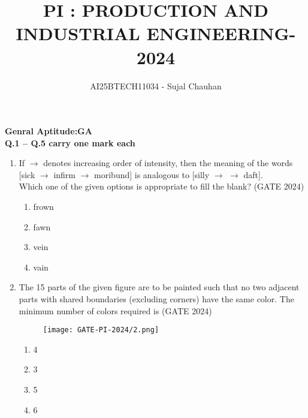 \documentclass[journal,12pt,onecolumn]{IEEEtran}
\theoremstyle{remark}
\begin{document}
\title{PI : PRODUCTION AND INDUSTRIAL ENGINEERING-2024}
\author{AI25BTECH11034 - Sujal Chauhan}
\maketitle
\renewcommand{\thefigure}{\theenumi}
\renewcommand{\thetable}{\theenumi}
\textbf{\large Genral Aptitude:GA}\\
\vspace{1cm}
\textbf{Q.1 -- Q.5 carry one mark each}
\begin{enumerate}

\item If $\to$ denotes increasing order of intensity, then the meaning of the words [sick $\to$ infirm $\to$ moribund] is analogous to [silly $\to$ \underline{\hspace{2cm}} $\to$ daft].\\
Which one of the given options is appropriate to fill the blank?
\hfill{(GATE 2024)}
\begin{multicols}{4}
\begin{enumerate}
    \item frown
    \item fawn
    \item vein
    \item vain
\end{enumerate}
\end{multicols}
\vspace{1cm}

\item The 15 parts of the given figure are to be painted such that no two adjacent parts with shared boundaries (excluding corners) have the same color. The minimum number of colors required is
\hfill{(GATE 2024)}
\begin{figure}[H]
    \centering
    \texttt{[image: GATE-PI-2024/2.png]} 
    \caption{}
    \label{2}
\end{figure}
\begin{multicols}{4}
\begin{enumerate}
    \item 4
    \item 3
    \item 5
    \item 6
\end{enumerate}
\end{multicols}
\vspace{1cm}


\end{enumerate}
\end{document}
